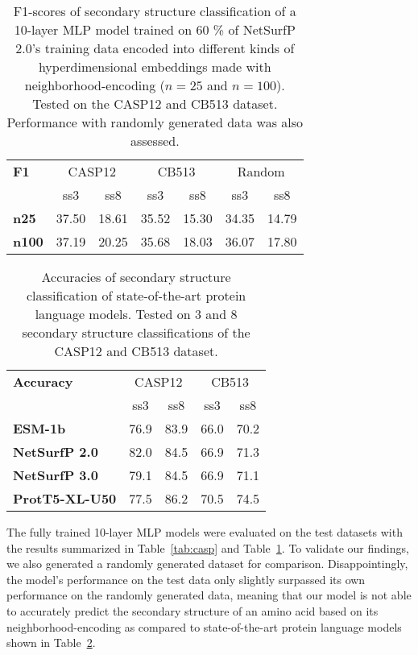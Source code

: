 \begin{table}[h]
    \caption{F1-scores of secondary structure classification of a 10-layer MLP model trained on 60 \% of NetSurfP 2.0's training data encoded into different kinds of hyperdimensional embeddings made with neighborhood-encoding ($n = 25$ and $n=100$). Tested on the CASP12 and CB513 dataset. Performance with randomly generated data was also assessed.}
    \label{tab:casp2}
    \centering
    \begin{tabular}{l|cc|cc|cc}
        \toprule
        \textbf{F1} & \multicolumn{2}{c|}{CASP12} & \multicolumn{2}{c|}{CB513} & \multicolumn{2}{c}{Random}\\
        & ss3 & ss8 & ss3 & ss8 & ss3 & ss8 \\
        \midrule
        \textbf{n25} & 37.50 & 18.61 & 35.52 & 15.30 & 34.35 & 14.79\\
        \textbf{n100} & 37.19 & 20.25 & 35.68 & 18.03 & 36.07 & 17.80\\
        \bottomrule
    \end{tabular}
\end{table}

\begin{table}[h]
    \caption{Accuracies of secondary structure classification of state-of-the-art protein language models. Tested on 3 and 8 secondary structure classifications of the CASP12 and CB513 dataset.}
    \label{tab:casp3}
    \centering
    \begin{tabular}{l|cc|cc}
        \toprule
        \textbf{Accuracy} & \multicolumn{2}{c|}{CASP12} & \multicolumn{2}{c|}{CB513}\\
        & ss3 & ss8 & ss3 & ss8\\
        \midrule
        \textbf{ESM-1b} & 76.9 & 83.9 & 66.0 & 70.2\\
        \textbf{NetSurfP 2.0} & 82.0 & 84.5 & 66.9 & 71.3\\
        \textbf{NetSurfP 3.0} & 79.1 & 84.5 & 66.9 & 71.1\\
        \textbf{ProtT5-XL-U50} & 77.5 & 86.2 & 70.5 & 74.5\\
        \bottomrule
    \end{tabular}
  \end{table}

The fully trained 10-layer MLP models were evaluated on the test datasets with the results summarized in Table~\ref{tab:casp} and Table~\ref{tab:casp2}. To validate our findings, we also generated a randomly generated dataset for comparison. Disappointingly, the model's performance on the test data only slightly surpassed its own performance on the randomly generated data, meaning that our model is not able to accurately predict the secondary structure of an amino acid based on its neighborhood-encoding as compared to state-of-the-art protein language models shown in Table~\ref{tab:casp3}.


